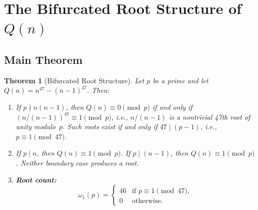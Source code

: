 \documentclass[11pt,a4paper]{article}
\newtheorem{theorem}{Theorem}[section]
\begin{document}
\section{The Bifurcated Root Structure of $Q(n)$}\label{sec:roots}

\subsection{Main Theorem}

\begin{theorem}[Bifurcated Root Structure]\label{thm:roots}
Let $p$ be a prime and let $Q(n) = n^{47} - (n{-}1)^{47}$.  Then:
\begin{enumerate}[label=(\alph*)]
  \item If $p \nmid n(n{-}1)$, then $Q(n) \equiv 0 \pmod{p}$
    if and only if $(n/(n{-}1))^{47} \equiv 1 \pmod{p}$, i.e.,
    $n/(n{-}1)$ is a nontrivial 47th root of unity modulo~$p$.
    Such roots exist if and only if $47 \mid (p{-}1)$, i.e.,
    $p \equiv 1 \pmod{47}$.
  \item If $p \mid n$, then $Q(n) \equiv 1 \pmod{p}$.
    If $p \mid (n{-}1)$, then $Q(n) \equiv 1 \pmod{p}$.
    Neither boundary case produces a root.
  \item \textbf{Root count:}
    \begin{equation}\label{eq:rootcount}
      \omega_1(p) =
      \begin{cases}
        46 & \text{if } p \equiv 1 \pmod{47}, \\
        0  & \text{otherwise.}
      \end{cases}
    \end{equation}
\end{enumerate}
\end{theorem}
\end{document}
